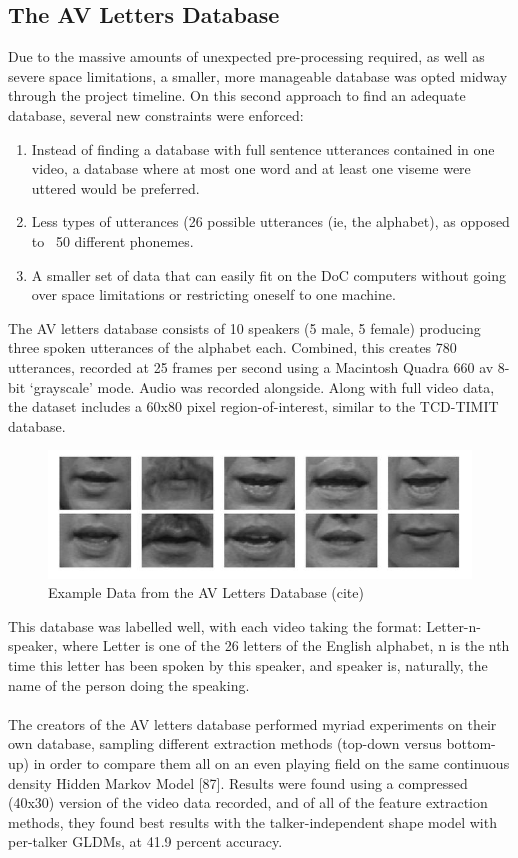 \documentclass[12pt,twoside]{report}
\begin{document}
		\subsection{The AV Letters Database}

Due to the massive amounts of unexpected pre-processing required, as well as severe space limitations, a smaller, more manageable database was opted midway through the project timeline. On this second approach to find an adequate database, several new constraints were enforced:

\begin{enumerate}
	\item Instead of finding a database with full sentence utterances contained in one video, a database where at most one word and at least one viseme were uttered would be preferred.
	\item Less types of utterances (26 possible utterances (ie, the alphabet), as opposed to ~50 different phonemes.
	\item A smaller set of data that can easily fit on the DoC computers without going over space limitations or restricting oneself to one machine.
\end{enumerate}

The AV letters database consists of 10 speakers (5 male, 5 female) producing three spoken utterances of the alphabet each. Combined, this creates 780 utterances, recorded at 25 frames per second using a Macintosh Quadra 660 av 8-bit ‘grayscale’ mode. Audio was recorded alongside. Along with full video data, the dataset includes a 60x80 pixel region-of-interest, similar to the TCD-TIMIT database. 

\begin{figure}[tb]
\centering
\includegraphics[width = 1.0\hsize]{./figures/exampleimagesavletters}
\caption{Example Data from the AV Letters Database (cite)}
\label{fig:avletters}
\end{figure} 

This database was labelled well, with each video taking the format: Letter-n-speaker, where Letter is one of the 26 letters of the English alphabet, n is the nth time this letter has been spoken by this speaker, and speaker is, naturally, the name of the person doing the speaking. 
\\ \\
The creators of the AV letters database performed myriad experiments on their own database, sampling different extraction methods (top-down versus bottom-up) in order to compare them all on an even playing field on the same continuous density Hidden Markov Model [87]. Results were found using a compressed (40x30) version of the video data recorded, and of all of the feature extraction methods, they found best results with the talker-independent shape model with per-talker GLDMs, at 41.9 percent accuracy.
\end{document}
